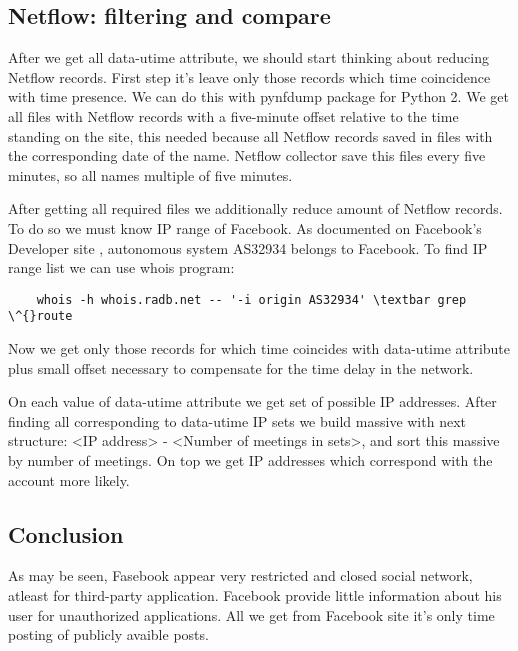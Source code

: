  \subsection{Netflow: filtering and compare}
 After we get all data-utime attribute, we should start thinking about reducing Netflow records. First step it's leave only those records which time coincidence with time presence. We can do this with pynfdump package for Python 2. We get all files with Netflow records with a five-minute offset relative to the time standing on the site, this needed because all Netflow records saved in files with the corresponding date of the name. Netflow collector save this files every five minutes, so all names multiple of five minutes. \par After getting all required files we additionally reduce amount of Netflow records. To do so we must know IP range of Facebook. As documented on Facebook's Developer site \cite{fbDevelop}, autonomous system AS32934 belongs to Facebook. To find IP range list we can use whois program:
 \begin{lstlisting}
    whois -h whois.radb.net -- '-i origin AS32934' \textbar grep \^{}route
\end{lstlisting}
Now we get only those records for which time coincides with data-utime attribute plus small offset necessary to compensate for the time delay in the network. \par On each value of data-utime attribute we get set of possible IP addresses. After finding all corresponding to data-utime IP sets we build massive with next structure: <IP address> - <Number of meetings in sets>, and sort this massive by number of meetings. On top we get IP addresses which correspond with the account more likely.
\subsection{Conclusion}
As may be seen, Fasebook appear very restricted and closed social network, atleast for third-party application. Facebook provide little information about his user for unauthorized applications. All we get from Facebook site it's only time posting of publicly avaible posts.
